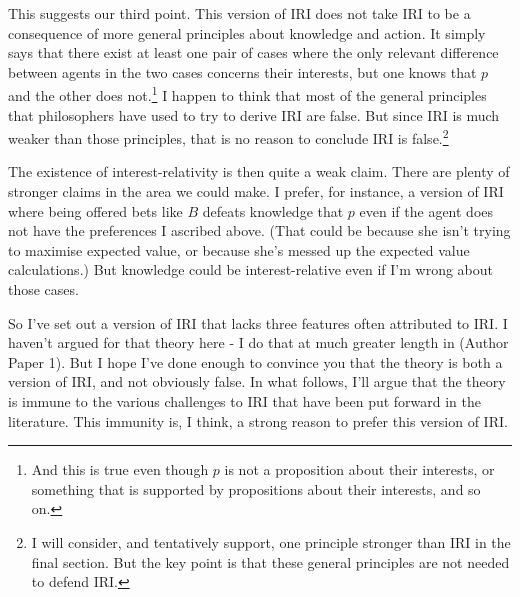This suggests our third point. This version of IRI does not take IRI to be a consequence of more general principles about knowledge and action. It simply says that there exist at least one pair of cases where the only relevant difference between agents in the two cases concerns their interests, but one knows that $p$ and the other does not.\footnote{And this is true even though $p$ is not a proposition about their interests, or something that is supported by propositions about their interests, and so on.} I happen to think that most of the general principles that philosophers have used to try to derive IRI are false. But since IRI is much weaker than those principles, that is no reason to conclude IRI is false.\footnote{I will consider, and tentatively support, one principle stronger than IRI in the final section. But the key point is that these general principles are not needed to defend IRI.}

The existence of interest-relativity is then quite a weak claim. There are plenty of stronger claims in the area we could make. I prefer, for instance, a version of IRI where being offered bets like $B$ defeats knowledge that $p$ even if the agent does not have the preferences I ascribed above. (That could be because she isn't trying to maximise expected value, or because she's messed up the expected value calculations.) But knowledge could be interest-relative even if I'm wrong about those cases.

So I've set out a version of IRI that lacks three features often attributed to IRI. I haven't argued for that theory here - I do that at much greater length in (Author Paper 1). But I hope I've done enough to convince you that the theory is  both a version of IRI, and not obviously false. In what follows, I'll argue that the theory is immune to the various challenges to IRI that have been put forward in the literature. This immunity is, I think, a strong reason to prefer this version of IRI.

